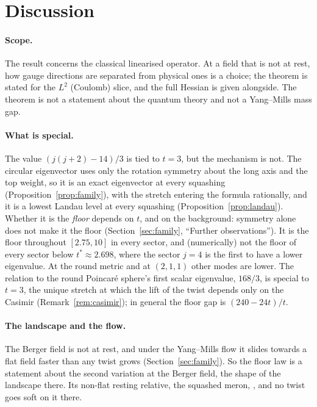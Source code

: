 \documentclass[11pt]{article}
\theoremstyle{definition}
\theoremstyle{remark}
\newif\ifredline
\newcommand{\redins}[1]{\ifredline{\color{blue}#1}\else#1\fi}
\newcommand{\reddel}[1]{\ifredline{\color{red}\sout{#1}}\fi}
\begin{document}
\section{Discussion}\label{sec:discussion}

\paragraph{Scope.} The result concerns the classical linearised operator. At a field that is not at
rest, how gauge directions are separated from physical ones is a choice; the theorem is stated for the
$L^2$ (Coulomb) slice, and the full Hessian is given alongside. The theorem is not a statement about the
quantum theory and not a Yang--Mills mass gap.

\paragraph{What is special.} The value $(j(j+2)-14)/3$ is tied to $t=3$, but the mechanism is not. The
circular eigenvector uses only the rotation symmetry about the long axis and the top weight, so it is an
exact eigenvector at every squashing (Proposition~\ref{prop:family}), with the stretch entering the formula
rationally, and it is a lowest Landau level at every squashing (Proposition~\ref{prop:landau}). Whether
it is the \emph{floor} depends on $t$, and on the background: symmetry alone does not make it the floor
(Section~\ref{sec:family}, ``Further observations''). It is the floor throughout $[2.75,10]$ in every sector, and (numerically) not the floor of every sector below
$t^*\approx2.698$, where the sector $j=4$ is the first to have a lower eigenvalue. At the round metric
and at $(2,1,1)$ other modes are lower. The relation to the \redins{round }Poincar\'e sphere's first scalar eigenvalue, $168/3$,
is special to $t=3$, the unique stretch at which the lift of the twist depends only on the Casimir
(Remark~\ref{rem:casimir}); in general the floor gap is $(240-24t)/t$.

\paragraph{The landscape and the flow.} The Berger field is not at rest, and under the Yang--Mills flow it
slides towards a flat field faster than any twist grows (Section~\ref{sec:family}). So the floor law is a
statement about the second variation at the Berger field, the shape of the landscape there. Its non-flat
resting relative, the squashed meron, \reddel{has a single unstable direction in every sector and at every stretch sampled ($j\le12$)}, and no
twist goes soft on it there.
\end{document}
